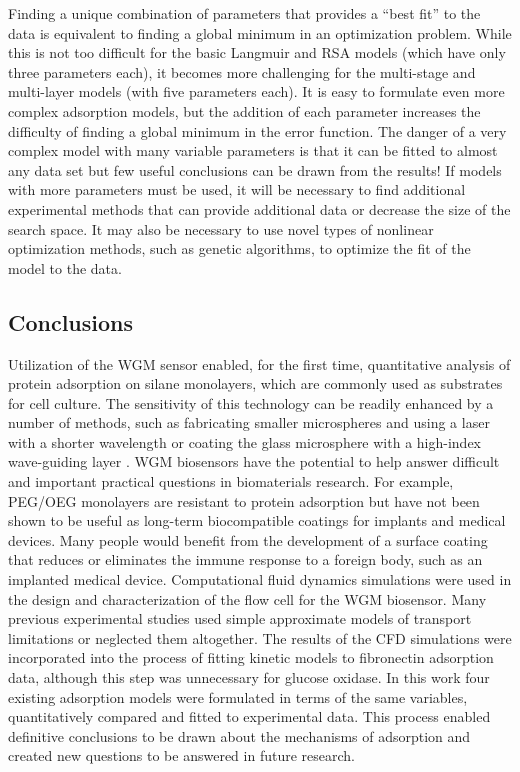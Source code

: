 Finding a unique combination of parameters that provides a {}``best
fit'' to the data is equivalent to finding a global minimum in an
optimization problem. While this is not too difficult for the basic
Langmuir and RSA models (which have only three parameters each), it
becomes more challenging for the multi-stage and multi-layer models
(with five parameters each). It is easy to formulate even more complex
adsorption models, but the addition of each parameter increases the
difficulty of finding a global minimum in the error function. The
danger of a very complex model with many variable parameters is that
it can be fitted to almost any data set but few useful conclusions
can be drawn from the results! If models with more parameters must
be used, it will be necessary to find additional experimental methods
that can provide additional data or decrease the size of the search
space. It may also be necessary to use novel types of nonlinear optimization
methods, such as genetic algorithms, to optimize the fit of the model
to the data.


\subsection{Conclusions}

Utilization of the WGM sensor enabled, for the first time, quantitative
analysis of protein adsorption on silane monolayers, which are commonly
used as substrates for cell culture. The sensitivity of this technology
can be readily enhanced by a number of methods, such as fabricating
smaller microspheres and using a laser with a shorter wavelength \cite{Vollmer2008a}
or coating the glass microsphere with a high-index wave-guiding layer
\cite{Teraoka2006}. WGM biosensors have the potential to help answer
difficult and important practical questions in biomaterials research.
For example, PEG/OEG monolayers are resistant to protein adsorption
but have not been shown to be useful as long-term biocompatible coatings
for implants and medical devices. Many people would benefit from the
development of a surface coating that reduces or eliminates the immune
response to a foreign body, such as an implanted medical device. Computational
fluid dynamics simulations were used in the design and characterization
of the flow cell for the WGM biosensor. Many previous experimental
studies used simple approximate models of transport limitations or
neglected them altogether. The results of the CFD simulations were
incorporated into the process of fitting kinetic models to fibronectin
adsorption data, although this step was unnecessary for glucose oxidase.
In this work four existing adsorption models were formulated in terms
of the same variables, quantitatively compared and fitted to experimental
data. This process enabled definitive conclusions to be drawn about
the mechanisms of adsorption and created new questions to be answered
in future research.
